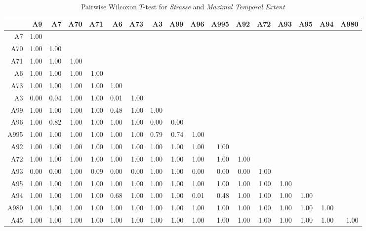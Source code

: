 \begin{table}[ht!]
	\tiny
	\setlength{\tabcolsep}{4pt}
	\centering
  \begin{tabular}{rrrrrrrrrrrrrrrrr}
    \toprule
         & A9 & A7 & A70 & A71 & A6 & A73 & A3 & A99 & A96 & A995 & A92 & A72 & A93 & A95 & A94 & A980 \\ 
    \midrule
    A7   & 1.00 &  &  &  &  &  &  &  &  &  &  &  &  &  &  &  \\ 
    A70  & 1.00 & 1.00 &  &  &  &  &  &  &  &  &  &  &  &  &  &  \\ 
    A71  & 1.00 & 1.00 & 1.00 &  &  &  &  &  &  &  &  &  &  &  &  &  \\ 
    A6   & 1.00 & 1.00 & 1.00 & 1.00 &  &  &  &  &  &  &  &  &  &  &  &  \\ 
    A73  & 1.00 & 1.00 & 1.00 & 1.00 & 1.00 &  &  &  &  &  &  &  &  &  &  &  \\ 
    A3   & 0.00 & 0.04 & 1.00 & 1.00 & 0.01 & 1.00 &  &  &  &  &  &  &  &  &  &  \\ 
    A99  & 1.00 & 1.00 & 1.00 & 1.00 & 0.48 & 1.00 & 1.00 &  &  &  &  &  &  &  &  &  \\ 
    A96  & 1.00 & 0.82 & 1.00 & 1.00 & 1.00 & 1.00 & 0.00 & 0.00 &  &  &  &  &  &  &  &  \\ 
    A995 & 1.00 & 1.00 & 1.00 & 1.00 & 1.00 & 1.00 & 0.79 & 0.74 & 1.00 &  &  &  &  &  &  &  \\ 
    A92  & 1.00 & 1.00 & 1.00 & 1.00 & 1.00 & 1.00 & 1.00 & 1.00 & 1.00 & 1.00 &  &  &  &  &  &  \\ 
    A72  & 1.00 & 1.00 & 1.00 & 1.00 & 1.00 & 1.00 & 1.00 & 1.00 & 1.00 & 1.00 & 1.00 &  &  &  &  &  \\ 
    A93  & 0.00 & 0.00 & 1.00 & 0.09 & 0.00 & 0.00 & 1.00 & 1.00 & 0.00 & 0.00 & 0.00 & 1.00 &  &  &  &  \\ 
    A95  & 1.00 & 1.00 & 1.00 & 1.00 & 1.00 & 1.00 & 1.00 & 1.00 & 1.00 & 1.00 & 1.00 & 1.00 & 1.00 &  &  &  \\ 
    A94  & 1.00 & 1.00 & 1.00 & 1.00 & 0.68 & 1.00 & 1.00 & 1.00 & 0.01 & 0.48 & 1.00 & 1.00 & 1.00 & 1.00 &  &  \\ 
    A980 & 1.00 & 1.00 & 1.00 & 1.00 & 1.00 & 1.00 & 1.00 & 1.00 & 1.00 & 1.00 & 1.00 & 1.00 & 1.00 & 1.00 & 1.00 &  \\ 
    A45  & 1.00 & 1.00 & 1.00 & 1.00 & 1.00 & 1.00 & 1.00 & 1.00 & 1.00 & 1.00 & 1.00 & 1.00 & 1.00 & 1.00 & 1.00 & 1.00 \\ 
    \bottomrule
  \end{tabular}
	\caption{Pairwise Wilcoxon $T$-test for \textit{Strasse} and \textit{Maximal Temporal Extent}}
	\label{tbl:wilcoxon_baysis_matched_Strasse_TMax}
\end{table}

